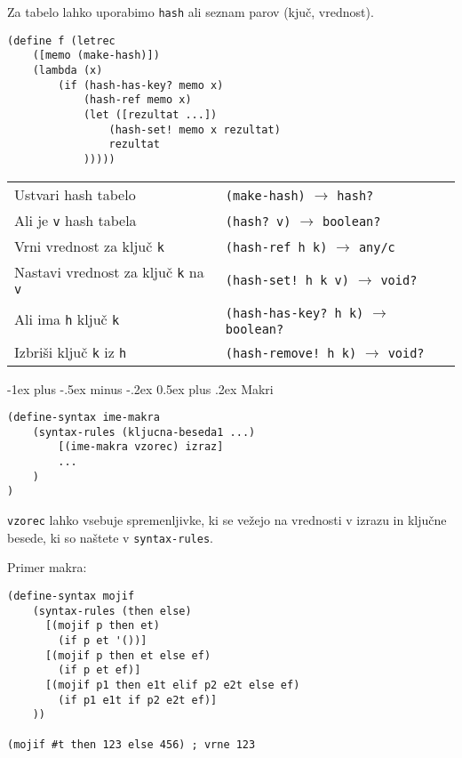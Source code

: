 \documentclass[a3paper,10pt]{extarticle}
\makeatletter
\renewcommand{\section}{\@startsection{section}{1}{0mm}%
                                {-1ex plus -.5ex minus -.2ex}%
                                {0.5ex plus .2ex}%
                                {\normalfont\large\bfseries}}
\makeatother
\begin{document}
\begin{multicols}{4}
Za tabelo lahko uporabimo \lstinline|hash| ali seznam parov (kjuč, vrednost).

\begin{lstlisting}
(define f (letrec 
    ([memo (make-hash)])
    (lambda (x) 
        (if (hash-has-key? memo x) 
            (hash-ref memo x) 
            (let ([rezultat ...])
                (hash-set! memo x rezultat)
                rezultat
            )))))
\end{lstlisting}

\begin{tabular}{@{}p{3.2cm}l@{}}
    Ustvari hash tabelo & \lstinline|(make-hash)| $\rightarrow$ \lstinline|hash?|\\
    Ali je \lstinline|v| hash tabela & \lstinline|(hash? v)| $\rightarrow$ \lstinline|boolean?|\\
    Vrni vrednost za ključ \lstinline|k| & \lstinline|(hash-ref h k)| $\rightarrow$ \lstinline|any/c|\\
    Nastavi vrednost za ključ \lstinline|k| na \lstinline|v| & \lstinline|(hash-set! h k v)| $\rightarrow$ \lstinline|void?|\\
    Ali ima \lstinline|h| ključ \lstinline|k| & \lstinline|(hash-has-key? h k)| $\rightarrow$ \lstinline|boolean?|\\
    Izbriši ključ \lstinline|k| iz \lstinline|h| & \lstinline|(hash-remove! h k)| $\rightarrow$ \lstinline|void?|\\
\end{tabular}

\section{Makri}
\begin{lstlisting}
(define-syntax ime-makra
    (syntax-rules (kljucna-beseda1 ...) 
        [(ime-makra vzorec) izraz]
        ...
    )
)
\end{lstlisting}

\lstinline|vzorec| lahko vsebuje spremenljivke, ki se vežejo na vrednosti v izrazu in ključne besede, ki so naštete v \lstinline|syntax-rules|.

Primer makra:
\begin{lstlisting}
(define-syntax mojif
    (syntax-rules (then else)
      [(mojif p then et) 
        (if p et '())]
      [(mojif p then et else ef)
        (if p et ef)]
      [(mojif p1 then e1t elif p2 e2t else ef)
        (if p1 e1t if p2 e2t ef)]
    ))

(mojif #t then 123 else 456) ; vrne 123
\end{lstlisting}


\end{multicols}
\end{document}
